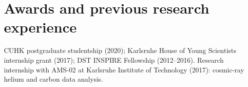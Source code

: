 \documentclass[11pt,a4paper]{article}
\begin{document}
\section*{Awards and previous research experience}
CUHK postgraduate studentship (2020); Karlsruhe House of Young Scientists internship grant (2017); DST INSPIRE Fellowship (2012--2016). Research internship with AMS-02 at Karlsruhe Institute of Technology (2017): cosmic-ray helium and carbon data analysis.
\end{document}
